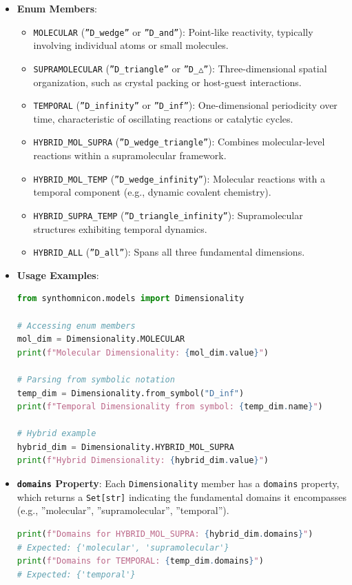 \documentclass[12pt,a4paper]{article}
\begin{document}
\begin{itemize}
    \item 
    \textbf{Enum Members}:

    \begin{itemize}
    \item \texttt{MOLECULAR} (\texttt{''D\_wedge''} or \texttt{''D\_and''}): Point-like reactivity, typically involving individual atoms or small molecules.
    \item \texttt{SUPRAMOLECULAR} (\texttt{''D\_triangle''} or \texttt{''D\_△''}): Three-dimensional spatial organization, such as crystal packing or host-guest interactions.
    \item \texttt{TEMPORAL} (\texttt{''D\_infinity''} or \texttt{''D\_inf''}): One-dimensional periodicity over time, characteristic of oscillating reactions or catalytic cycles.
    \item \texttt{HYBRID\_MOL\_SUPRA} (\texttt{''D\_wedge\_triangle''}): Combines molecular-level reactions within a supramolecular framework.
    \item \texttt{HYBRID\_MOL\_TEMP} (\texttt{''D\_wedge\_infinity''}): Molecular reactions with a temporal component (e.g., dynamic covalent chemistry).
    \item \texttt{HYBRID\_SUPRA\_TEMP} (\texttt{''D\_triangle\_infinity''}): Supramolecular structures exhibiting temporal dynamics.
    \item \texttt{HYBRID\_ALL} (\texttt{''D\_all''}): Spans all three fundamental dimensions.
\end{itemize}

    \item 
    \textbf{Usage Examples}:

    \begin{lstlisting}[language=Python]
from synthomnicon.models import Dimensionality

# Accessing enum members
mol_dim = Dimensionality.MOLECULAR
print(f"Molecular Dimensionality: {mol_dim.value}")

# Parsing from symbolic notation
temp_dim = Dimensionality.from_symbol("D_inf")
print(f"Temporal Dimensionality from symbol: {temp_dim.name}")

# Hybrid example
hybrid_dim = Dimensionality.HYBRID_MOL_SUPRA
print(f"Hybrid Dimensionality: {hybrid_dim.value}")
\end{lstlisting}

    \item 
    \textbf{\texttt{domains} Property}:
Each \texttt{Dimensionality} member has a \texttt{domains} property, which returns a \texttt{Set{[}str{]}} indicating the fundamental domains it encompasses (e.g., ''molecular'', ''supramolecular'', ''temporal'').

    \begin{lstlisting}[language=Python]
print(f"Domains for HYBRID_MOL_SUPRA: {hybrid_dim.domains}")
# Expected: {'molecular', 'supramolecular'}
print(f"Domains for TEMPORAL: {temp_dim.domains}")
# Expected: {'temporal'}
\end{lstlisting}

\end{itemize}
\end{document}
